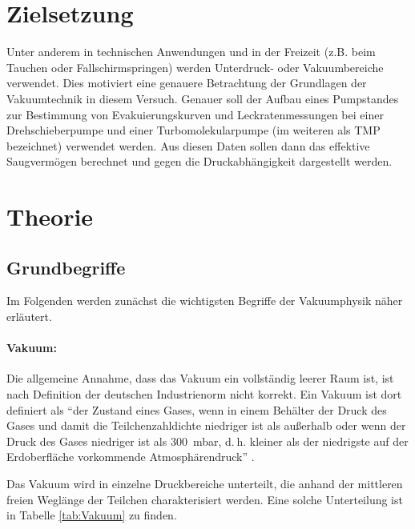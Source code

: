 \section{Zielsetzung}
\label{sec:Zielsetzung}
Unter anderem in technischen Anwendungen und in der Freizeit
(z.B. beim Tauchen oder Fallschirmspringen)
werden Unterdruck- oder Vakuumbereiche verwendet.
Dies motiviert eine genauere Betrachtung der Grundlagen der Vakuumtechnik
in diesem Versuch.
Genauer soll der Aufbau eines Pumpstandes zur Bestimmung von Evakuierungskurven und Leckratenmessungen
bei einer Drehschieberpumpe und einer Turbomolekularpumpe (im weiteren als TMP bezeichnet) verwendet werden.
Aus diesen Daten sollen dann das effektive Saugvermögen berechnet und gegen die Druckabhängigkeit dargestellt werden.


\section{Theorie}
\label{sec:Theorie}
\subsection{Grundbegriffe}

Im Folgenden werden zunächst die wichtigsten Begriffe der Vakuumphysik näher erläutert.
\paragraph{Vakuum:}
Die allgemeine Annahme, dass das Vakuum ein vollständig leerer Raum ist, ist nach Definition der
deutschen Industrienorm nicht korrekt.
Ein Vakuum ist dort definiert als
\enquote{der Zustand eines Gases, wenn in einem Behälter der
Druck des Gases und damit die Teilchenzahldichte niedriger ist als außerhalb oder wenn der Druck
des Gases niedriger ist als \SI{300}{\milli\bar},
d. h. kleiner als der niedrigste auf der Erdoberfläche vorkommende Atmosphärendruck} \cite{vakuum}.

Das Vakuum wird in einzelne Druckbereiche unterteilt,
die anhand der mittleren freien Weglänge der Teilchen charakterisiert werden.
Eine solche Unterteilung ist in Tabelle \ref{tab:Vakuum} zu finden.

